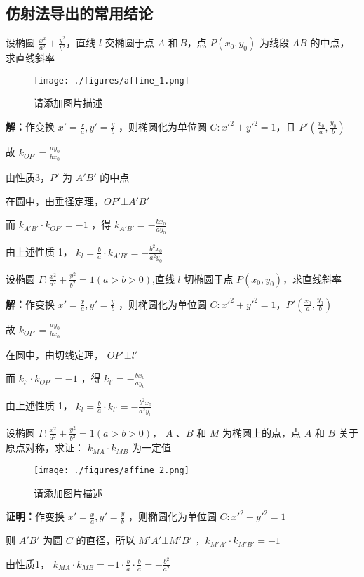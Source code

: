 \subsection{仿射法导出的常用结论}
\begin{corollary}{}
设椭圆 \(\frac{x^2}{a^2}+\frac{y^2}{b^2}\)，直线 \(l\) 交椭圆于点 \(A\) 和\,\(B\)，点 \(P(x_0,y_0)\) 为线段 \(AB\) 的中点，求直线斜率
\begin{figure}[ht]
\centering
\texttt{[image: ./figures/affine\_1.png]}
\caption{请添加图片描述} \label{affine_fig1}
\end{figure}

\textbf{解：}作变换 \(x'=\frac{x}{a},y'=\frac{y}{b}\) ，则椭圆化为单位圆 \(C:x'^2+y'^2=1\)，且 \(P'\left(\frac{x_0}{a},\frac{y_0}{b}\right)\)

故 \(k_{OP'}=\frac{ay_0}{bx_0}\)

由性质3，\(P'\) 为 \(A'B'\) 的中点

在圆中，由垂径定理，\(OP'\bot A'B'\)

而 \(k_{A'B'}\cdot k_{OP'}=-1\) ，得 \(k_{A'B'}=-\frac{bx_0}{ay_0}\)

由上述性质 1， \(k_l=\frac{b}{a}\cdot k_{A'B'}=-\frac{b^2x_0}{a^2y_0}\)
\end{corollary}
\begin{corollary}{}
设椭圆   \(\Gamma:\frac{x^2}{a^2}+\frac{y^2}{b^2}=1(a>b>0)\),直线 \(l\) 切椭圆于点 \(P(x_0,y_0)\)，求直线斜率 

\textbf{解：}作变换 \(x'=\frac{x}{a},y'=\frac{y}{b}\) ，则椭圆化为单位圆 \(C:x'^2+y'^2=1\)，\(P'\left(\frac{x_0}{a},\frac{y_0}{b}\right)\) 

故  \(k_{OP'}=\frac{ay_0}{bx_0}\) 

在圆中，由切线定理， \(OP'\bot l'\) 

而  \(k_{l'}\cdot k_{OP'}=-1\) ，得 \(k_{l'}=-\frac{bx_0}{ay_0}\) 

由上述性质 1， \(k_l=\frac{b}{a}\cdot k_{l'}=-\frac{b^2x_0}{a^2y_0}\) 

\end{corollary}

\begin{corollary}{}
设椭圆 \(\Gamma:\frac{x^2}{a^2}+\frac{y^2}{b^2}=1(a>b>0)\)， \(A\) 、\(B\) 和 \(M\) 为椭圆上的点，点 \(A\) 和 \(B\) 关于原点对称，求证： \(k_{MA}\cdot k_{MB}\) 为一定值
​
\begin{figure}[ht]
\centering
\texttt{[image: ./figures/affine\_2.png]}
\caption{请添加图片描述} \label{affine_fig2}
\end{figure}

\textbf{证明：}作变换 \(x'=\frac{x}{a},y'=\frac{y}{b}\) ，则椭圆化为单位圆 \(C:x'^2+y'^2=1\)

则 \(A'B'\) 为圆 \(C\) 的直径，所以 \(M'A'\bot M'B'\) ，\(k_{M'A'}\cdot k_{M'B'}=-1\)

由性质1， \(k_{MA}\cdot k_{MB}=-1\cdot \frac{b}{a}\cdot \frac{b}{a}=-\frac{b^2}{a^2}\)

\end{corollary}

